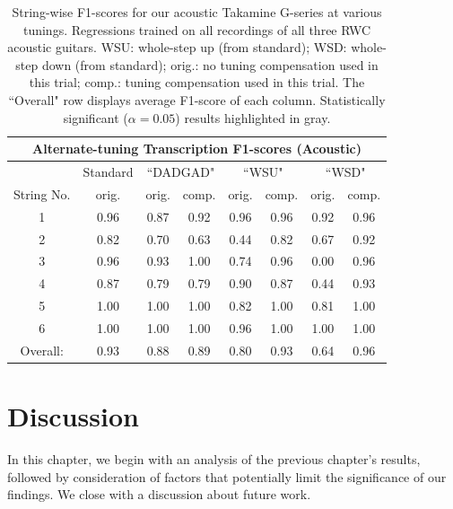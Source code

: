 \documentclass[12pt]{cmuthesis}
\begin{document}
\begin{table}[!htbp]
\begin{center}
\begin{tabular}{||c||c||c|c||c|c||c|c||}
\hline
\multicolumn{8}{|c|}{\bf{Alternate-tuning Transcription F1-scores (Acoustic)}} \\
\hline
& Standard & \multicolumn{2}{|c|}{``DADGAD"} & \multicolumn{2}{|c|}{``WSU"} & \multicolumn{2}{|c|}{``WSD"} \\
\hline
String No. & orig. & orig. & comp. & orig. & comp. & orig. & comp. \\
\hline
1 & 0.96 & 0.87 & 0.92 & 0.96 & 0.96 & 0.92 & 0.96 \\
\hline
2 & 0.82 & 0.70 & 0.63 & 0.44 & 0.82 & 0.67 & 0.92\\
\hline
3 & 0.96 & 0.93 & 1.00 & 0.74 & 0.96 & 0.00 & 0.96\\
\hline
4 & 0.87 & 0.79 & 0.79 & 0.90 & 0.87 & 0.44 & 0.93 \\
\hline
5 & 1.00 & 1.00 & 1.00 & 0.82 & 1.00 & 0.81 & 1.00 \\
\hline
6 & 1.00 & 1.00 & 1.00 & 0.96 & 1.00 & 1.00 & 1.00\\ 
\hline
\hline
Overall: & 0.93 & 0.88 & 0.89 & \cellcolor[gray]{0.8}0.80 & \cellcolor[gray]{0.8}0.93 & \cellcolor[gray]{0.8}0.64 & \cellcolor[gray]{0.8}0.96\\
\hline
\end{tabular}
\caption{String-wise F1-scores for our acoustic Takamine G-series at various tunings. Regressions trained on all recordings of all three RWC acoustic guitars. WSU: whole-step up (from standard); WSD: whole-step down (from standard); orig.: no tuning compensation used in this trial; comp.: tuning compensation used in this trial. The ``Overall" row displays average F1-score of each column. Statistically significant ($\alpha=0.05$) results highlighted in gray.} 
\label{tab:results-ag-tune}
\end{center}
\end{table}

\noindent
\chapter{Discussion}
\label{chap:discussion}
In this chapter, we begin with an analysis of the previous chapter's results, followed by consideration of factors that potentially limit the significance of our findings. We close with a discussion about future work.
\end{document}
